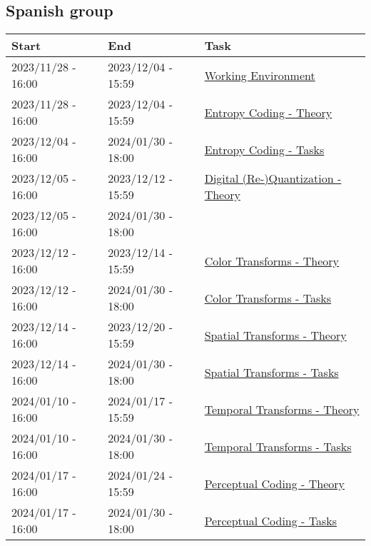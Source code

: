 \subsection{Spanish group}
\begin{tabular}{lll}
  Start & End & Task \\
  \hline
  2023/11/28 - 16:00 & 2023/12/04 - 15:59 & \href{https://sistemas-multimedia.github.io/contents/working_environment/}{Working Environment} \\
  2023/11/28 - 16:00 & 2023/12/04 - 15:59 & \href{https://sistemas-multimedia.github.io/contents/entropy_coding/}{Entropy Coding - Theory} \\
  2023/12/04 - 16:00 & 2024/01/30 - 18:00 & \href{https://sistemas-multimedia.github.io/contents/entropy_coding/#x1-110007}{Entropy Coding - Tasks} \\
  2023/12/05 - 16:00 & 2023/12/12 - 15:59 & \href{https://sistemas-multimedia.github.io/contents/quantization/}{Digital (Re-)Quantization - Theory} \\
  2023/12/05 - 16:00 & 2024/01/30 - 18:00 & \href{https://sistemas-multimedia.github.io/contents/quantization/#x1-150008}{{Digital (Re-)Quantization - Tasks} \\
  2023/12/12 - 16:00 & 2023/12/14 - 15:59 & \href{https://sistemas-multimedia.github.io/contents/color_transforms/}{Color Transforms - Theory} \\
  2023/12/12 - 16:00 & 2024/01/30 - 18:00 & \href{https://sistemas-multimedia.github.io/contents/color_transforms/#x1-100006}{Color Transforms - Tasks} \\
  2023/12/14 - 16:00 & 2023/12/20 - 15:59 & \href{https://sistemas-multimedia.github.io/contents/spatial_transforms/}{Spatial Transforms - Theory} \\
  2023/12/14 - 16:00 & 2024/01/30 - 18:00 & \href{https://sistemas-multimedia.github.io/contents/spatial_transforms/#x1-80006}{Spatial Transforms - Tasks} \\
  2024/01/10 - 16:00 & 2024/01/17 - 15:59 & \href{https://sistemas-multimedia.github.io/contents/temporal_transforms/}{Temporal Transforms - Theory} \\
  2024/01/10 - 16:00 & 2024/01/30 - 18:00 & \href{https://sistemas-multimedia.github.io/contents/temporal_transforms/#x1-90008}{Temporal Transforms - Tasks} \\
  2024/01/17 - 16:00 & 2024/01/24 - 15:59 & \href{https://sistemas-multimedia.github.io/contents/perceptual_coding/}{Perceptual Coding - Theory} \\
  2024/01/17 - 16:00 & 2024/01/30 - 18:00 & \href{https://sistemas-multimedia.github.io/contents/perceptual_coding/#x1-100009}{Perceptual Coding - Tasks} \\
\end{tabular}
 